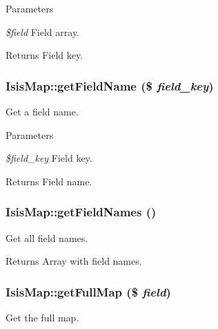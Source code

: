 \begin{DoxyParams}{Parameters}
\item[{\em \$field}]Field array.\end{DoxyParams}
\begin{DoxyReturn}{Returns}
Field key. 
\end{DoxyReturn}
\hypertarget{classIsisMap_ae41313537e399f15ff16a4db887cf5b9}{
\subsubsection[{getFieldName}]{\setlength{\rightskip}{0pt plus 5cm}IsisMap::getFieldName (\$ {\em field\_\-key})}}
\label{classIsisMap_ae41313537e399f15ff16a4db887cf5b9}
Get a field name.


\begin{DoxyParams}{Parameters}
\item[{\em \$field\_\-key}]Field key.\end{DoxyParams}
\begin{DoxyReturn}{Returns}
Field name. 
\end{DoxyReturn}
\hypertarget{classIsisMap_a157fffbdb6c533a66e3f73674bfd8ea4}{
\subsubsection[{getFieldNames}]{\setlength{\rightskip}{0pt plus 5cm}IsisMap::getFieldNames ()}}
\label{classIsisMap_a157fffbdb6c533a66e3f73674bfd8ea4}
Get all field names.

\begin{DoxyReturn}{Returns}
Array with field names. 
\end{DoxyReturn}
\hypertarget{classIsisMap_a2ca9d83aad166eed936f6f9ef8df05e3}{
\subsubsection[{getFullMap}]{\setlength{\rightskip}{0pt plus 5cm}IsisMap::getFullMap (\$ {\em field})}}
\label{classIsisMap_a2ca9d83aad166eed936f6f9ef8df05e3}
Get the full map.


